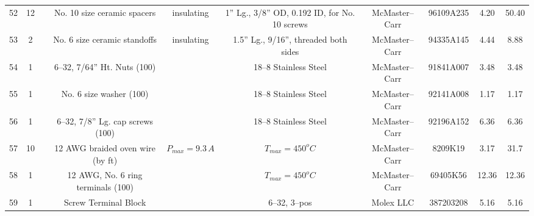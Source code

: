 \documentclass[10pt, twocolumn]{article}
\begin{document}
\begin{center}
\begin{adjustbox}{max width=\textwidth}
\begin{tabular}{c c c c c c c c c c}
52	&12	&	&No. 10 size ceramic spacers	&insulating	&1” Lg., 3/8” OD, 0.192 ID, for No. 10 screws
	&McMaster--Carr	&96109A235		&4.20	&50.40	\\

53	&2	&	&No. 6 size ceramic standoffs	&insulating	&1.5” Lg., 9/16”, threaded both sides
	&McMaster--Carr	&94335A145		&4.44	&8.88	\\

54	&1	&	&6--32, 7/64” Ht. Nuts (100)	&	&18--8 Stainless Steel
	&McMaster--Carr	&91841A007		&3.48	&3.48	\\

55	&1	&	&No. 6 size washer (100)	&	&18--8 Stainless Steel
	&McMaster--Carr	&92141A008		&1.17	&1.17	\\

56	&1	&	&6--32, 7/8” Lg. cap screws (100)	&	&18--8 Stainless Steel
	&McMaster--Carr	&92196A152		&6.36	&6.36	\\

57	&10	&	&12 AWG braided oven wire (by ft)	&$P_{max}=9.3\,A$	&$T_{max}=450^{o}C$
	&McMaster--Carr	&8209K19		&3.17	&31.7	\\

58	&1	&	&12 AWG, No. 6 ring terminals (100)	&	&$T_{max}=450^{o}C$
	&McMaster--Carr	&69405K56		&12.36	&12.36	\\

59	&1	&	&Screw Terminal Block		&	&6--32, 3--pos
	&Molex LLC	&387203208		&5.16	&5.16	\\

\hline\hline
\end{tabular}
\end{adjustbox}
\label{mcmaster-bill-of-materials}
\end{center}
\end{document}

